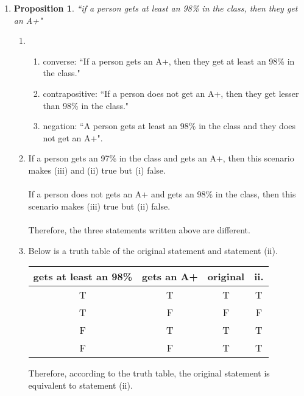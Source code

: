 \documentclass{article}
\newtheorem{prop}[thm]{Proposition}
\begin{document}
\begin{enumerate}
\item 
\begin{prop}
``if a person gets at least an 98\% in the class, then they get an A+"
\end{prop}
\begin{enumerate}
    \item 
    \begin{enumerate}
    \item{converse:}
    ``If a person gets an A+, then they get at least an 98\% in the class."
    \item{contrapositive:}
    ``If a person does not get an A+, then they get lesser than 98\% in the class."
    \item{negation:}
    ``A person gets at least an 98\% in the class and they does not get an A+".
    \end{enumerate}
    \item 
    If a person gets an 97\% in the class and gets an A+, then this scenario makes (iii) and (ii) true but (i) false. \\ \\
    If a person does not gets an A+ and gets an 98\% in the class, then this scenario makes (iii) true but (ii) false. \\ \\
    Therefore, the three statements written above are different.
    \item 
    Below is a truth table of the original statement and statement (ii).
\begin{center}
    \begin{tabular}{|c|c|c|c|}
    \hline
    gets at least an 98\% & gets an A+ & original & ii. \\ \hline
    T & T & T & T\\ \hline
    T & F & F & F\\ \hline
    F & T & T & T\\ \hline
    F & F & T & T\\ \hline
\end{tabular}
\end{center}
Therefore, according to the truth table, the original statement is equivalent to statement (ii).
\end{enumerate}


\end{enumerate}
\end{document}
